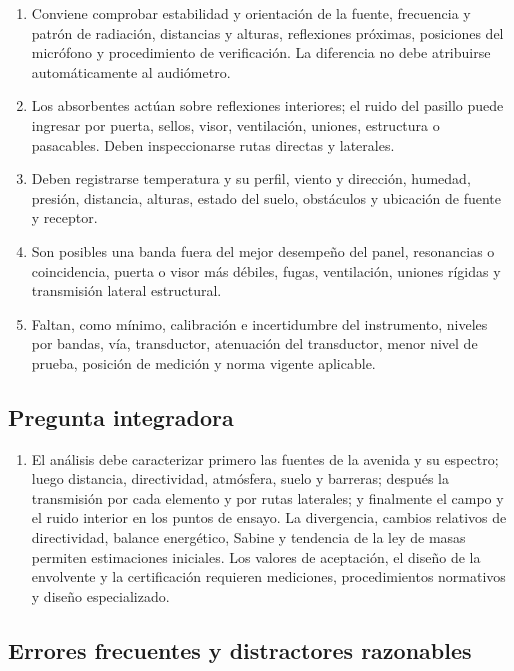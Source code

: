 \begin{enumerate}[label=\textbf{F\arabic*.},leftmargin=*]
    \item Conviene comprobar estabilidad y orientación de la fuente, frecuencia
    y patrón de radiación, distancias y alturas, reflexiones próximas,
    posiciones del micrófono y procedimiento de verificación. La diferencia no
    debe atribuirse automáticamente al audiómetro.
    \item Los absorbentes actúan sobre reflexiones interiores; el ruido del
    pasillo puede ingresar por puerta, sellos, visor, ventilación, uniones,
    estructura o pasacables. Deben inspeccionarse rutas directas y laterales.
    \item Deben registrarse temperatura y su perfil, viento y dirección,
    humedad, presión, distancia, alturas, estado del suelo, obstáculos y
    ubicación de fuente y receptor.
    \item Son posibles una banda fuera del mejor desempeño del panel,
    resonancias o coincidencia, puerta o visor más débiles, fugas, ventilación,
    uniones rígidas y transmisión lateral estructural.
    \item Faltan, como mínimo, calibración e incertidumbre del instrumento,
    niveles por bandas, vía, transductor, atenuación del transductor, menor
    nivel de prueba, posición de medición y norma vigente aplicable.
\end{enumerate}

\subsection*{Pregunta integradora}

\begin{enumerate}[label=\textbf{I\arabic*.},leftmargin=*]
    \item El análisis debe caracterizar primero las fuentes de la avenida y su
    espectro; luego distancia, directividad, atmósfera, suelo y barreras; después
    la transmisión por cada elemento y por rutas laterales; y finalmente el
    campo y el ruido interior en los puntos de ensayo. La divergencia, cambios
    relativos de directividad, balance energético, Sabine y tendencia de la ley
    de masas permiten estimaciones iniciales. Los valores de aceptación, el
    diseño de la envolvente y la certificación requieren mediciones,
    procedimientos normativos y diseño especializado.
\end{enumerate}

\subsection*{Errores frecuentes y distractores razonables}

